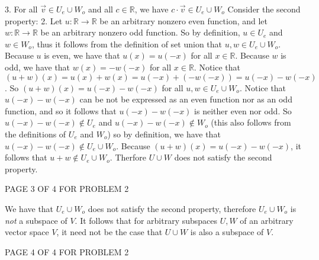 \documentclass[12pt]{article}
\newenvironment{problem}[2][Problem]
{
	\begin{trivlist} 
		\item[\hskip \labelsep {\bfseries #1 #2:}]
	}
{
	\end{trivlist}
	}
\begin{document}
\begin{problem}{2}
3. For all $\vec{v} \in U_e\cup W_o$ and all $c \in \mathbb{R}$, we have $c\cdot \vec{v} \in U_e\cup W_o$
\noindent
\newline
\newline
Consider the second property:
\newline
2. Let $u: \mathbb{R} \to \mathbb{R}$ be an arbitrary nonzero even function, and let $w: \mathbb{R} \to \mathbb{R}$ be an arbitrary nonzero odd function. So by definition, $u \in U_e$ and $w\in W_o$, thus it follows from the definition of set union that $u,w \in U_e \cup W_o$. Because $u$ is even, we have that $u(x) = u(-x)$ for all $x \in \mathbb{R}$. Because $w$ is odd, we have that $w(x) = -w(-x)$ for all $x \in \mathbb{R}$. Notice that $(u+w)(x)= u(x) + w(x) = u(-x) + (-w(-x)) = u(-x) - w(-x)$. So $(u+w)(x)=u(-x) - w(-x)$ for all $u,w \in U_e\cup W_o$. Notice that $u(-x) - w(-x)$ can be not be expressed as an even function nor as an odd function, and so it follows that $u(-x) - w(-x)$ is neither even nor odd. So $u(-x) - w(-x) \notin U_e$ and $u(-x) - w(-x) \notin W_o$ (this also follows from the definitions of $U_e$ and $W_o$) so by definition, we have that $u(-x) - w(-x) \notin U_e\cup W_o$. Because  $(u+w)(x) = u(-x) - w(-x)$, it follows that $u+w \notin U_e\cup W_o$. Therfore $U \cup W$ does not satisfy the second property.
\vfill
\centerline{PAGE 3 OF 4 FOR PROBLEM 2}
We have that $U_e \cup W_o$ does not satisfy the second property, therefore $U_e \cup W_o$ is {\it not} a subspace of $V$. It follows that for arbitrary subspaces $U,W$ of an arbitrary vector space $V$, it need not be the case that $U\cup W$ is also a subspace of $V$.
\vfill
\centerline{PAGE 4 OF 4 FOR PROBLEM 2}
\end{problem}
\end{document}
